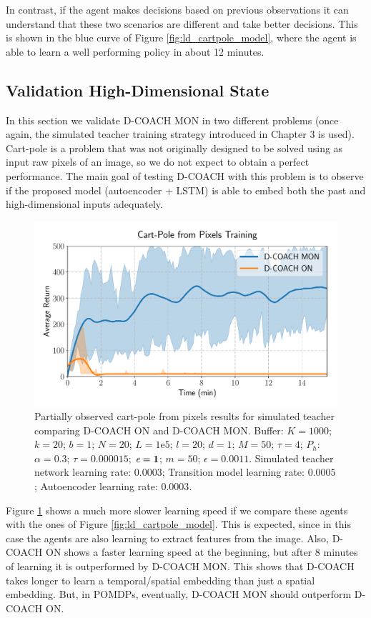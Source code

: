 In contrast, if the agent makes decisions based on previous observations it can understand that these two scenarios are different and take better decisions. This is shown in the blue curve of Figure \ref{fig:ld_cartpole_model}, where the agent is able to learn a well performing policy in about 12 minutes. 

\subsection{Validation High-Dimensional State}
In this section we validate D-COACH MON in two different problems (once again, the simulated teacher training strategy introduced in Chapter 3 is used). Cart-pole is a problem that was not originally designed to be solved using as input raw pixels of an image, so we do not expect to obtain a perfect performance. The main goal of testing D-COACH with this problem is to observe if the proposed model (autoencoder + LSTM) is able to embed both the past and high-dimensional inputs adequately.

\begin{figure}[H]
    \centering
    \includegraphics[width=0.8\linewidth]{imagenes/cap3/cartpole_HD_model.pdf}
    \caption{Partially observed cart-pole from pixels results for simulated teacher comparing D-COACH ON and D-COACH MON.  Buffer: $K = 1000$; $k=20$; $b = 1$; $N = 20$; $L=1\mathrm{e}5$; $l=20$; $d=1$; $M=50$; $\tau=4$; $P_{h}$: $\alpha = 0.3$; $\tau = 0.000015$; $\emph{e}=\textbf{1}$; $m=50$; $\epsilon=0.0011$. Simulated teacher network learning rate: $0.0003$; Transition model learning rate: $0.0005$; Autoencoder learning rate: $0.0003$.}
    \label{fig:cp_hd}
\end{figure}

Figure \ref{fig:cp_hd} shows a much more slower learning speed if we compare these agents with the ones of Figure \ref{fig:ld_cartpole_model}. This is expected, since in this case the agents are also learning to extract features from the image. Also, D-COACH ON shows a faster learning speed at the beginning, but after 8 minutes of learning it is outperformed by D-COACH MON. This shows that D-COACH takes longer to learn a temporal/spatial embedding than just a spatial embedding. But, in POMDPs, eventually, D-COACH MON should outperform D-COACH ON.

